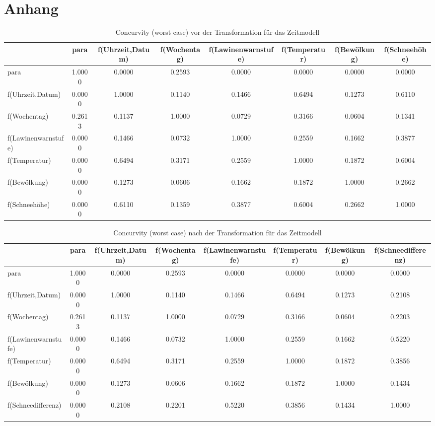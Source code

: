 \documentclass[12pt]{scrreprt}
\begin{document}
\chapter{Anhang}
\begin{table}[htbp]
	\centering
	\vspace{-1em}
	\caption{Concurvity (worst case) vor der Transformation für das Zeitmodell}
	\begin{adjustbox}{max width=\textwidth}
		\begin{tabular}{lccccccc}
			& para & f(Uhrzeit,Datum) & f(Wochentag) & f(Lawinenwarnstufe) & f(Temperatur) & f(Bewölkung) & f(Schneehöhe) \\
			\midrule
			\midrule
			para  & 1.0000 & 0.0000 & 0.2593 & 0.0000 & 0.0000 & 0.0000 & 0.0000 \\
			f(Uhrzeit,Datum) & 0.0000 & 1.0000 & 0.1140 & 0.1466 & 0.6494 & 0.1273 & 0.6110 \\
			f(Wochentag) & 0.2613 & 0.1137 & 1.0000 & 0.0729 & 0.3166 & 0.0604 & 0.1341 \\
			f(Lawinenwarnstufe) & 0.0000 & 0.1466 & 0.0732 & 1.0000 & 0.2559 & 0.1662 & 0.3877 \\
			f(Temperatur) & 0.0000 & 0.6494 & 0.3171 & 0.2559 & 1.0000 & 0.1872 & 0.6004 \\
			f(Bewölkung) & 0.0000 & 0.1273 & 0.0606 & 0.1662 & 0.1872 & 1.0000 & 0.2662 \\
			f(Schneehöhe) & 0.0000 & 0.6110  & 0.1359 & 0.3877 & 0.6004 & 0.2662 & 1.0000 \\
			\bottomrule
		\end{tabular}%
		\label{con1}%
	\end{adjustbox}
\end{table}%

\begin{table}[htbp]
	\centering
	\caption{Concurvity (worst case) nach der Transformation für das Zeitmodell}
	\begin{adjustbox}{max width=\textwidth}
		\begin{tabular}{lccccccc}
			& para & f(Uhrzeit,Datum) & f(Wochentag) & f(Lawinenwarnstufe) & f(Temperatur) & f(Bewölkung) & f(Schneedifferenz) \\
			\midrule
			\midrule
			para  & 1.0000 & 0.0000 & 0.2593 & 0.0000 & 0.0000 & 0.0000 & 0.0000 \\
			f(Uhrzeit,Datum) & 0.0000 & 1.0000 & 0.1140 & 0.1466 & 0.6494 & 0.1273 & 0.2108 \\
			f(Wochentag) & 0.2613 & 0.1137 & 1.0000 & 0.0729 & 0.3166 & 0.0604 & 0.2203 \\
			f(Lawinenwarnstufe) & 0.0000 & 0.1466 & 0.0732 & 1.0000 & 0.2559 & 0.1662 & 0.5220 \\
			f(Temperatur) & 0.0000 & 0.6494 & 0.3171 & 0.2559 & 1.0000 & 0.1872 & 0.3856 \\
			f(Bewölkung) & 0.0000 & 0.1273 & 0.0606 & 0.1662 & 0.1872 & 1.0000 & 0.1434 \\
			f(Schneedifferenz) & 0.0000 & 0.2108 & 0.2201 & 0.5220 & 0.3856 & 0.1434 & 1.0000 \\
			\bottomrule
		\end{tabular}%
		\label{con2}%
	\end{adjustbox}
\end{table}%


	
\end{document}
